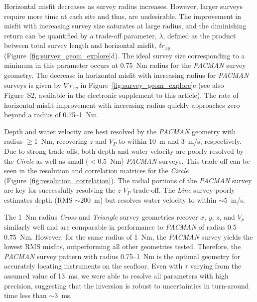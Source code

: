 Horizontal misfit decreases as survey radius increases. However, larger surveys require more time at each site and thus, are undesirable. The improvement in misfit with increasing survey size saturates at large radius, and the diminishing return can be quantified by a trade-off parameter, $\lambda$, defined as the product between total survey length and horizontal misfit, $\delta r_{xy}$ (Figure~\ref{fig:survey_geom_explore}d). The ideal survey size corresponding to a minimum in this parameter occurs at 0.75~Nm radius for the \textit{PACMAN} survey geometry. The decrease in horizontal misfit with increasing radius for \textit{PACMAN} surveys is given by $\nabla r_{xy}$ in Figure~\ref{fig:survey_geom_explore}e (see also Figure~S2, available in the electronic supplement to this article). The rate of horizontal misfit improvement with increasing radius quickly approaches zero beyond a radius of 0.75--1~Nm.

Depth and water velocity are best resolved by the \textit{PACMAN} geometry with radius $\geq$1~Nm, recovering $z$ and $V_{P}$ to within 10~m and 3~m/s, respectively. Due to strong trade-offs, both depth and water velocity are poorly resolved by the \textit{Circle} as well as small ($<$0.5~Nm) \textit{PACMAN} surveys. This trade-off can be seen in the resolution and correlation matrices for the \textit{Circle} (Figure~\ref{fig:resolution_correlation}). The radial portions of the \textit{PACMAN} survey are key for successfully resolving the $z$-$V_P$ trade-off. The \textit{Line} survey poorly estimates depth (RMS $\sim$200~m) but resolves water velocity to within $\sim$5~m/s.

The 1~Nm radius \textit{Cross} and \textit{Triangle} survey geometries recover $x$, $y$, $z$, and $V_{p}$ similarly well and are comparable in performance to \textit{PACMAN} of radius 0.5--0.75~Nm. However, for the same radius of 1~Nm, the \textit{PACMAN} survey yields the lowest RMS misfits, outperforming all other geometries tested. Therefore, the \textit{PACMAN} survey pattern with radius 0.75--1~Nm is the optimal geometry for accurately locating instruments on the seafloor. Even with $\tau$ varying from the assumed value of 13~ms, we were able to resolve all parameters with high precision, suggesting that the inversion is robust to uncertainties in turn-around time less than $\sim$3~ms.


